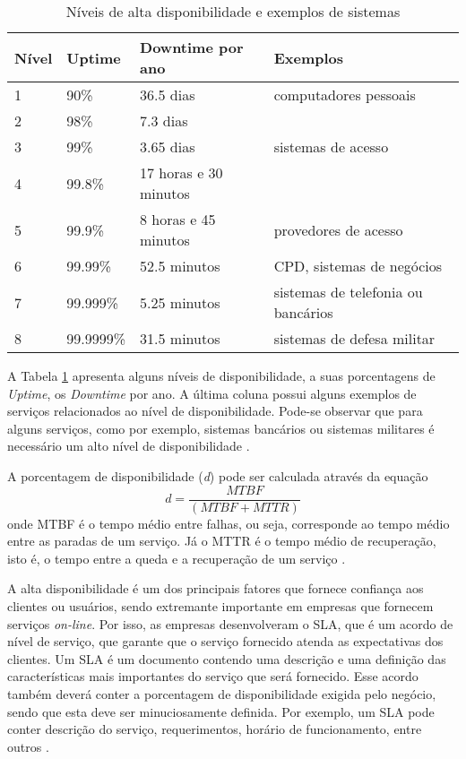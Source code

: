 \begin{table}
\caption {Níveis de alta disponibilidade e exemplos de sistemas}
\label{tab:dispniveis}
\begin{center}
\begin{tabular}{|l|l|l|l|}\hline
Nível & Uptime & Downtime por ano & Exemplos\\\hline
1 & 90\% & 36.5 dias & computadores pessoais\\\hline
2 & 98\% & 7.3 dias & \\\hline
3 & 99\% & 3.65 dias & sistemas de acesso\\\hline
4 & 99.8\% & 17 horas e 30 minutos & \\\hline
5 & 99.9\% & 8 horas e 45 minutos & provedores de acesso\\\hline
6 & 99.99\% & 52.5 minutos & CPD, sistemas de negócios\\\hline
7 & 99.999\% & 5.25 minutos & sistemas de telefonia ou bancários\\\hline
8 & 99.9999\% & 31.5 minutos & sistemas de defesa militar\\\hline
\end{tabular}
\end{center}
\end{table}

A Tabela \ref{tab:dispniveis} apresenta alguns níveis de disponibilidade, a suas porcentagens de \textit{Uptime}, os \textit{Downtime} por ano. 
A última coluna possui alguns exemplos de serviços relacionados ao nível de disponibilidade. Pode-se observar que para alguns serviços, 
como por exemplo, sistemas bancários ou sistemas militares é necessário um alto nível de disponibilidade \cite{pereirafilho2004}.

A porcentagem de disponibilidade (\textit{d}) pode ser calculada através da equação
\begin{equation}
d = \frac{MTBF}{(MTBF + MTTR)}
\label{disponibilidade}
\end{equation}
onde \ac{MTBF} é o tempo médio entre falhas, ou seja, corresponde ao tempo médio entre as paradas de um serviço. Já o \ac{MTTR} é o 
tempo médio de recuperação, isto é, o tempo entre a queda e a recuperação de um serviço \cite{goncalves2009}.

A alta disponibilidade é um dos principais fatores que fornece confiança aos clientes ou usuários, sendo extremante importante 
em empresas que fornecem serviços \textit{on-line}. Por isso, as empresas desenvolveram o \ac{SLA}, que é um acordo de nível de serviço, 
que garante que o serviço fornecido atenda as expectativas dos clientes. Um \ac{SLA} é um documento contendo uma descrição e uma definição 
das características mais importantes do serviço que será fornecido. Esse acordo também deverá conter a porcentagem de disponibilidade exigida
pelo negócio, sendo que esta deve ser minuciosamente definida. Por exemplo, um \ac{SLA} pode conter descrição do serviço, requerimentos, 
horário de funcionamento, entre outros \cite{smith2010}.
